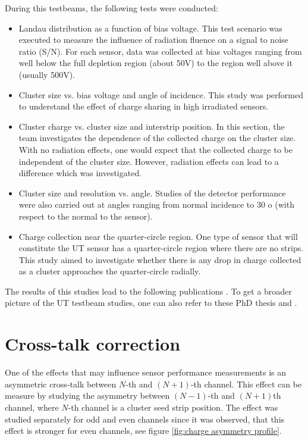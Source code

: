 During this testbeams, the following tests were conducted: 

\begin{itemize}
\item Landau distribution as a function of bias voltage. This test scenario was executed to measure the influence of radiation fluence on a signal to noise ratio (S/N).  For each sensor, data was collected at bias voltages ranging from well below the full depletion region (about 50V) to the region well above it (usually 500V).
\item  Cluster size vs. bias voltage and angle of incidence.  This study was performed to understand the effect of charge sharing in high irradiated sensors. 
\item Cluster charge vs. cluster size and interstrip position. In this section, the team investigates the dependence of the collected charge on the cluster size. With no radiation effects, one would expect that the collected charge to be independent of the cluster size. However, radiation effects can lead to a difference which was investigated. 
\item Cluster size and resolution vs. angle.  Studies of the detector performance were also carried out at angles ranging from normal incidence to 30 o (with respect to the normal to the sensor). 
\item Charge collection near the quarter-circle region. One type of sensor that will constitute the UT sensor has a quarter-circle region where there are no strips. This study aimed to investigate whether there is any drop in charge collected as a cluster approaches the quarter-circle radially. 
\end{itemize}

The results of this studies lead to the following publications \cite{tb1} \cite{tb2} \cite{tb3}. To get a broader picture of the UT testbeam studies, one can also refer to these PhD thesis \cite{Federica} and \cite{Kelsey}.


\section{Cross-talk correction}

One of the effects that may influence sensor performance measurements is an asymmetric cross-talk between $N$-th and $(N+1)$-th channel. This effect can be measure by studying the asymmetry between $(N-1)$-th and $(N+1)$th channel, where $N$-th channel is a cluster seed strip position. The effect was studied separately for odd and even channels since it was observed, that this effect is stronger for even channels, see figure \ref{fig:charge asymmetry profile}.  


